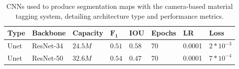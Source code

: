 \begin{table}[htbp]
\caption[Camera-based materia tagging --- neural network parameters]{CNNs used to produce segmentation maps with the camera-based material tagging system, detailing architecture type and performance metrics.}\label{tab:cog-model}
\centering
    \begin{tabular}{llllllll}
    \toprule
    \textbf{Type}         & \textbf{Backbone}  & \textbf{Capacity} & \textbf{$\mathbf{F_{1}}$} & \textbf{IOU}  & \textbf{Epochs} &  \textbf{LR} & \textbf{Loss} \\
    \midrule
    Unet                  & ResNet-34          & $24.5M$           & $0.51$                & $0.58$    & 70              & \num{0.0001} & $2*10^{-3}$   \\
    Unet                  & ResNet-50          & $32.6M$           & $0.54$                & $0.47$    & 70              & \num{0.0001} & $7*10^{-4}$   \\
    \bottomrule
    \end{tabular}
\end{table}